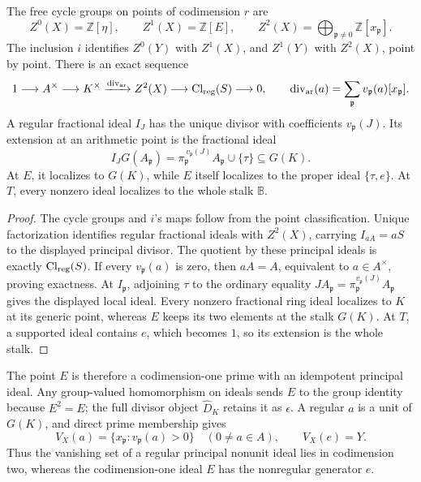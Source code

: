 \begin{proposition}\label{prop:sz-divisor-sequence}
The free cycle groups on points of codimension \(r\) are
\[
 Z^0(X)=\mathbb Z[\eta],\qquad Z^1(X)=\mathbb Z[E],\qquad
 Z^2(X)=\bigoplus_{\mathfrak p\ne0}\mathbb Z[x_{\mathfrak p}].
\]
The inclusion \(i\) identifies \(Z^0(Y)\) with \(Z^1(X)\), and
\(Z^1(Y)\) with \(Z^2(X)\), point by point.
There is an exact sequence
\begin{equation}\label{eq:sz-divisor-sequence}
 1\longrightarrow A^\times\longrightarrow K^\times
 \xrightarrow{\operatorname{div}_{\rm ar}}Z^2(X)
 \longrightarrow\mathrm{Cl}_{\rm reg}(S)\longrightarrow0,\qquad
 \operatorname{div}_{\rm ar}(a)=
 \sum_{\mathfrak p}v_{\mathfrak p}(a)[x_{\mathfrak p}].
\end{equation}
A regular fractional ideal \(I_J\) has the unique divisor with
coefficients \(v_{\mathfrak p}(J)\).
Its extension at an arithmetic point is the fractional ideal
\[
 I_JG(A_{\mathfrak p})
 =\pi_{\mathfrak p}^{\,v_{\mathfrak p}(J)}A_{\mathfrak p}
   \cup\{\tau\}\subseteq G(K).
\]
At \(E\), it localizes to \(G(K)\), while \(E\) itself localizes to
the proper ideal \(\{\tau,e\}\). At \(T\), every nonzero ideal
localizes to the whole stalk \(\mathbb B\).
\end{proposition}
\begin{proof}
The cycle groups and \(i\)'s maps follow from the point classification.
Unique factorization identifies regular fractional ideals with
\(Z^2(X)\), carrying \(I_{aA}=aS\) to the displayed principal divisor.
The quotient by these principal ideals is exactly
\(\mathrm{Cl}_{\rm reg}(S)\). If every \(v_{\mathfrak p}(a)\) is zero,
then \(aA=A\), equivalent to \(a\in A^\times\), proving exactness.
At \(I_{\mathfrak p}\), adjoining \(\tau\) to the ordinary equality
\(JA_{\mathfrak p}=\pi_{\mathfrak p}^{v_{\mathfrak p}(J)}A_{\mathfrak p}\)
gives the displayed local ideal.
Every nonzero fractional ring ideal localizes to \(K\) at its
generic point, whereas \(E\) keeps its two elements at the stalk
\(G(K)\). At \(T\), a supported ideal contains \(e\), which becomes
\(1\), so its extension is the whole stalk.
\end{proof}

The point \(E\) is therefore a codimension-one prime with an
idempotent principal ideal. Any group-valued homomorphism on ideals
sends \(E\) to the group identity because \(E^2=E\); the full divisor
object \(\widehat D_K\) retains it as \(\epsilon\).
A regular \(a\) is a unit of \(G(K)\), and direct prime membership gives
\[
 V_X(a)=\{x_{\mathfrak p}:v_{\mathfrak p}(a)>0\}\quad(0\ne a\in A),
 \qquad V_X(e)=Y .
\]
Thus the vanishing set of a regular principal nonunit ideal lies
in codimension two, whereas the codimension-one ideal \(E\) has
the nonregular generator \(e\).


